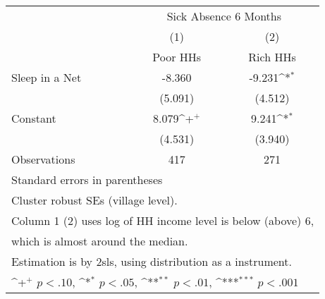 {
\def\sym#1{\ifmmode^{#1}\else\(^{#1}\)\fi}
\begin{tabular}{l*{2}{c}}
\hline\hline
                    &\multicolumn{2}{c}{Sick Absence 6 Months}  \\
                    &\multicolumn{1}{c}{(1)}         &\multicolumn{1}{c}{(2)}         \\
                    &    Poor HHs         &    Rich HHs         \\
\hline
Sleep in a Net      &      -8.360         &      -9.231\sym{*}  \\
                    &     (5.091)         &     (4.512)         \\
[1em]
Constant            &       8.079\sym{+}  &       9.241\sym{*}  \\
                    &     (4.531)         &     (3.940)         \\
\hline
Observations        &         417         &         271         \\
\hline\hline
\multicolumn{3}{l}{\footnotesize Standard errors in parentheses}\\
\multicolumn{3}{l}{\footnotesize Cluster robust SEs (village level).}\\
\multicolumn{3}{l}{\footnotesize  Column 1 (2) uses log of HH income level is below (above) 6,}\\
\multicolumn{3}{l}{\footnotesize which is almost around the median.}\\
\multicolumn{3}{l}{\footnotesize Estimation is by 2sls, using distribution as a instrument.}\\
\multicolumn{3}{l}{\footnotesize \sym{+} \(p<.10\), \sym{*} \(p<.05\), \sym{**} \(p<.01\), \sym{***} \(p<.001\)}\\
\end{tabular}
}
